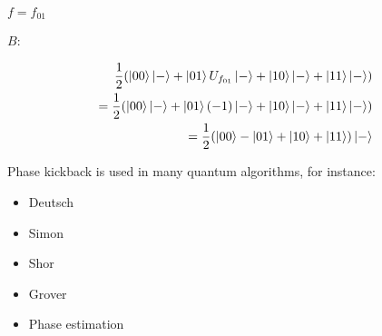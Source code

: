 \documentclass[12pt,twoside,a4paper]{article}
\begin{document}
$f = f_{01}$

$B$:

\begin{equation*}
        \begin{split}
                \frac{1}{2} (\ket{00} \ket{-} + \ket{01} U_{f_{01}} \ket{-} + \ket{10} \ket{-} + \ket{11} \ket{-}) \\
                = \frac{1}{2} (\ket{00} \ket{-} + \ket{01} (-1) \ket{-} + \ket{10} \ket{-} + \ket{11} \ket{-}) \\
                = \frac{1}{2} (\ket{00} - \ket{01} + \ket{10} + \ket{11}) \ket{-}
        \end{split}
\end{equation*}

Phase kickback is used in many quantum algorithms, for instance:
\begin{itemize}
        \item Deutsch
        \item Simon
        \item Shor
        \item Grover
        \item Phase estimation
\end{itemize}
\end{document}
